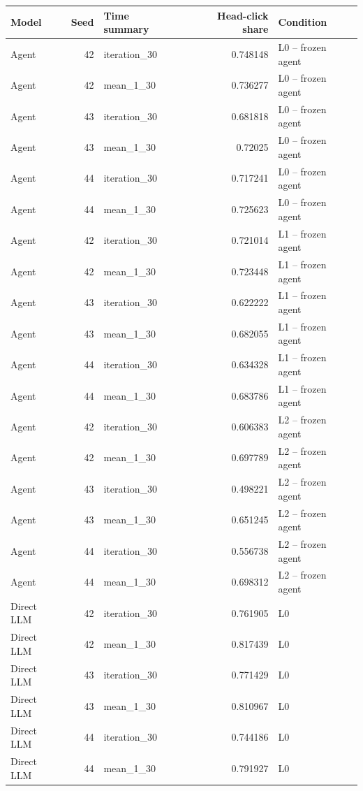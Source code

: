 \begin{table}[htbp!]
\centering
\small
\setlength{\tabcolsep}{3pt}
\renewcommand{\arraystretch}{1.1}
\begin{tabular}{lrlrl}
\hline
Model & Seed & Time summary & Head-click share & Condition \\
\hline
Agent & 42 & iteration\_30 & 0.748148 & L0 -- frozen agent \\
Agent & 42 & mean\_1\_30 & 0.736277 & L0 -- frozen agent \\
Agent & 43 & iteration\_30 & 0.681818 & L0 -- frozen agent \\
Agent & 43 & mean\_1\_30 & 0.72025 & L0 -- frozen agent \\
Agent & 44 & iteration\_30 & 0.717241 & L0 -- frozen agent \\
Agent & 44 & mean\_1\_30 & 0.725623 & L0 -- frozen agent \\
Agent & 42 & iteration\_30 & 0.721014 & L1 -- frozen agent \\
Agent & 42 & mean\_1\_30 & 0.723448 & L1 -- frozen agent \\
Agent & 43 & iteration\_30 & 0.622222 & L1 -- frozen agent \\
Agent & 43 & mean\_1\_30 & 0.682055 & L1 -- frozen agent \\
Agent & 44 & iteration\_30 & 0.634328 & L1 -- frozen agent \\
Agent & 44 & mean\_1\_30 & 0.683786 & L1 -- frozen agent \\
Agent & 42 & iteration\_30 & 0.606383 & L2 -- frozen agent \\
Agent & 42 & mean\_1\_30 & 0.697789 & L2 -- frozen agent \\
Agent & 43 & iteration\_30 & 0.498221 & L2 -- frozen agent \\
Agent & 43 & mean\_1\_30 & 0.651245 & L2 -- frozen agent \\
Agent & 44 & iteration\_30 & 0.556738 & L2 -- frozen agent \\
Agent & 44 & mean\_1\_30 & 0.698312 & L2 -- frozen agent \\
Direct LLM & 42 & iteration\_30 & 0.761905 & L0 \\
Direct LLM & 42 & mean\_1\_30 & 0.817439 & L0 \\
Direct LLM & 43 & iteration\_30 & 0.771429 & L0 \\
Direct LLM & 43 & mean\_1\_30 & 0.810967 & L0 \\
Direct LLM & 44 & iteration\_30 & 0.744186 & L0 \\
Direct LLM & 44 & mean\_1\_30 & 0.791927 & L0 \\

\end{tabular}
\end{table}
